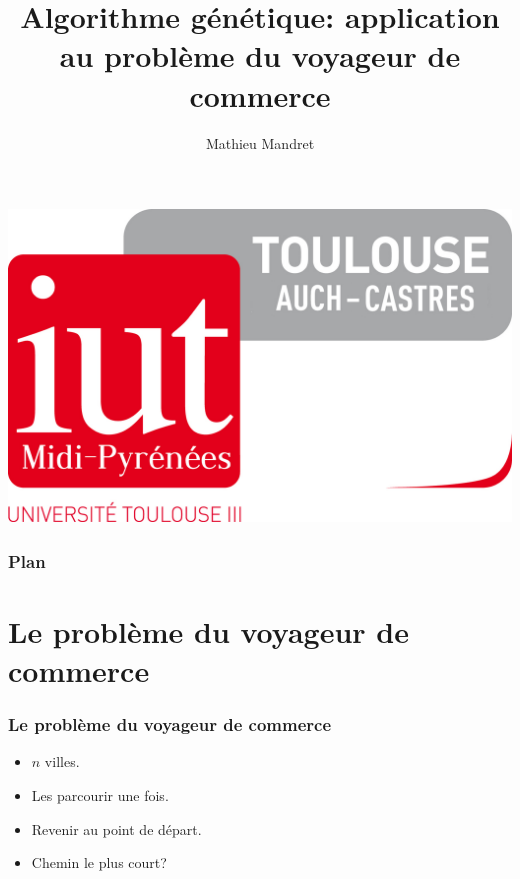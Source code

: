 \documentclass[16pt]{beamer}
\title{Algorithme génétique: application au problème du voyageur de commerce}
\author{Mathieu Mandret}
\institute{IUT Paul Sabatier}
\begin{document}
\begin{frame}
  \maketitle
  \centering
  \includegraphics[scale=0.05]{logo_IUT.png}
\end{frame}

\begin{frame}
  \frametitle{Plan}
  \tableofcontents
\end{frame}

\section{Le problème du voyageur de commerce}
\begin{frame}
  \frametitle{Le problème du voyageur de commerce}
  \begin{itemize}
    \item $n$ villes.
    \item Les parcourir une fois.
    \item Revenir au point de départ.
    \item Chemin le plus court?
  \end{itemize}
\end{frame}
\end{document}
